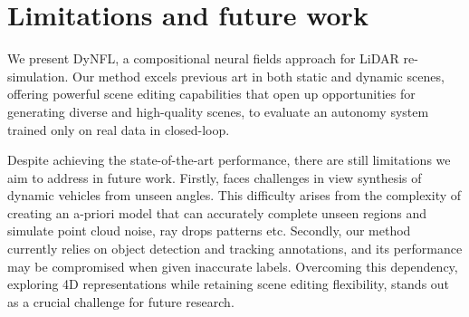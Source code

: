 \section{Limitations and future work}
We present DyNFL, a compositional neural fields approach for LiDAR re-simulation. Our method excels previous art in both static and dynamic scenes, offering powerful scene editing capabilities that open up opportunities for generating diverse and high-quality scenes, to evaluate an autonomy system trained only on real data in closed-loop.

Despite achieving the state-of-the-art performance, there are still limitations we aim to address in future work. Firstly, \dynfl faces challenges in view synthesis of dynamic vehicles from unseen angles. This difficulty arises from the complexity of creating an a-priori model that can accurately complete unseen regions and simulate point cloud noise, ray drops patterns etc. Secondly, our method currently relies on object detection and tracking annotations, and its performance may be compromised when given inaccurate labels. Overcoming this dependency, exploring 4D representations while retaining scene editing flexibility, stands out as a crucial challenge for future research.



